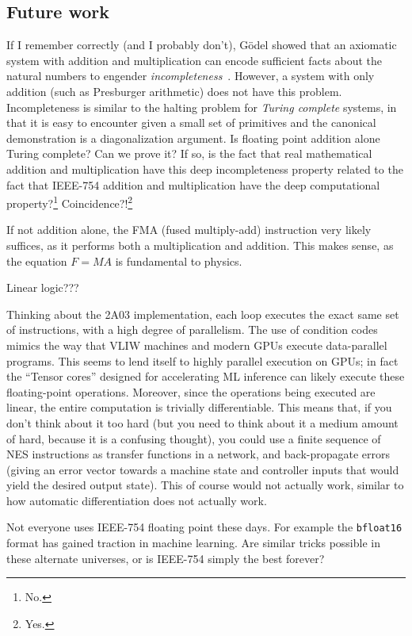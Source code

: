 \documentclass[twocolumn]{article}
\begin{document}
\subsection{Future work}

If I remember correctly (and I probably don't), G\"odel showed that
an axiomatic system with addition and multiplication can encode
sufficient facts about the natural numbers to engender {\it
  incompleteness}~\cite{goedel1930incompleteness}. However, a system
with only addition (such as Presburger arithmetic) does not have this
problem. Incompleteness is similar to the halting problem for {\it
  Turing complete} systems, in that it is easy to encounter given a
small set of primitives and the canonical demonstration is a
diagonalization argument. Is floating point addition alone Turing
complete? Can we prove it? If so, is the fact that real mathematical
addition and multiplication have this deep incompleteness property
related to the fact that IEEE-754 addition and multiplication have the
deep computational property?\footnote{No.}
Coincidence?!\footnote{Yes.}

If not addition alone, the FMA (fused multiply-add) instruction very
likely suffices, as it performs both a multiplication and addition.
This makes sense, as the equation $F = M\!A$ is fundamental to physics.

\medskip
Linear logic???

\medskip
Thinking about the 2A03 implementation, each loop executes the exact
same set of instructions, with a high degree of parallelism. The use
of condition codes mimics the way that VLIW machines and modern GPUs
execute data-parallel programs. This seems to lend itself to highly
parallel execution on GPUs; in fact the ``Tensor cores'' designed for
accelerating ML inference can likely execute these floating-point
operations. Moreover, since the operations being executed are linear,
the entire computation is trivially differentiable. This means that,
if you don't think about it too hard (but you need to think about it a
medium amount of hard, because it is a confusing thought), you could
use a finite sequence of NES instructions as transfer functions in a
network, and back-propagate errors (giving an error vector towards a
machine state and controller inputs that would yield the desired
output state). This of course would not actually work, similar to how
automatic differentiation does not actually work.

Not everyone uses IEEE-754 floating point these days. For example the
{\tt bfloat16} format has gained traction in machine learning. Are
similar tricks possible in these alternate universes, or is IEEE-754
simply the best forever?
\end{document}
